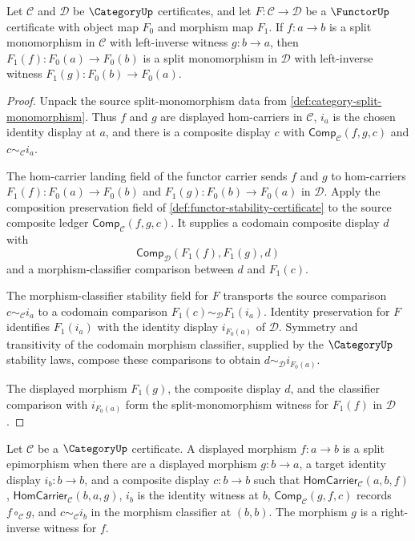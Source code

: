 \begin{theorem}
\label{thm:functor-preserves-split-monomorphism}
Let $\mathcal C$ and $\mathcal D$ be $\CategoryUp$ certificates, and let
$F:\mathcal C\to\mathcal D$ be a $\FunctorUp$ certificate with object map
$F_0$ and morphism map $F_1$. If $f:a\to b$ is a split monomorphism in
$\mathcal C$ with left-inverse witness $g:b\to a$, then
$F_1(f):F_0(a)\to F_0(b)$ is a split monomorphism in $\mathcal D$ with
left-inverse witness $F_1(g):F_0(b)\to F_0(a)$.
\end{theorem}
\begin{proof}
Unpack the source split-monomorphism data from
\autoref{def:category-split-monomorphism}. Thus $f$ and $g$ are displayed
hom-carriers in $\mathcal C$, $i_a$ is the chosen identity display at $a$, and
there is a composite display $c$ with $\mathsf{Comp}_{\mathcal C}(f,g,c)$ and
$c\sim_{\mathcal C} i_a$.

The hom-carrier landing field of the functor carrier sends $f$ and $g$ to
hom-carriers $F_1(f):F_0(a)\to F_0(b)$ and
$F_1(g):F_0(b)\to F_0(a)$ in $\mathcal D$. Apply the composition preservation
field of \autoref{def:functor-stability-certificate} to the source composite
ledger $\mathsf{Comp}_{\mathcal C}(f,g,c)$. It supplies a codomain composite
display $d$ with
$$
\mathsf{Comp}_{\mathcal D}(F_1(f),F_1(g),d)
$$
and a morphism-classifier comparison between $d$ and $F_1(c)$.

The morphism-classifier stability field for $F$ transports the source
comparison $c\sim_{\mathcal C} i_a$ to a codomain comparison
$F_1(c)\sim_{\mathcal D}F_1(i_a)$. Identity preservation for $F$ identifies
$F_1(i_a)$ with the identity display $i_{F_0(a)}$ of $\mathcal D$. Symmetry
and transitivity of the codomain morphism classifier, supplied by the
$\CategoryUp$ stability laws, compose these comparisons to obtain
$d\sim_{\mathcal D} i_{F_0(a)}$.

The displayed morphism $F_1(g)$, the composite display $d$, and the classifier
comparison with $i_{F_0(a)}$ form the split-monomorphism witness for $F_1(f)$
in $\mathcal D$.
\end{proof}

\begin{definition}
\label{def:category-split-epimorphism}
Let $\mathcal C$ be a $\CategoryUp$ certificate. A displayed morphism
$f:a\to b$ is a split epimorphism when there are a displayed morphism
$g:b\to a$, a target identity display $i_b:b\to b$, and a composite display
$c:b\to b$ such that $\mathsf{HomCarrier}_{\mathcal C}(a,b,f)$,
$\mathsf{HomCarrier}_{\mathcal C}(b,a,g)$, $i_b$ is the identity witness at
$b$, $\mathsf{Comp}_{\mathcal C}(g,f,c)$ records $f\circ_{\mathcal C} g$, and
$c\sim_{\mathcal C} i_b$ in the morphism classifier at $(b,b)$. The morphism
$g$ is a right-inverse witness for $f$.
\end{definition}

